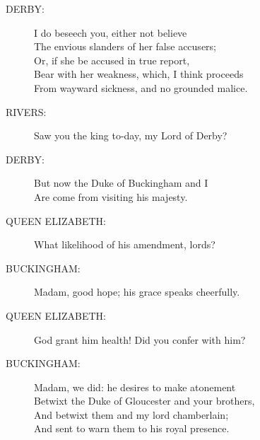 \documentclass{article}
\begin{document}
\begin{description}
\item[DERBY:] 
\hspace{1pt}I do beseech you, either not believe\\
\hspace{1pt}The envious slanders of her false accusers;\\
\hspace{1pt}Or, if she be accused in true report,\\
\hspace{1pt}Bear with her weakness, which, I think proceeds\\
\hspace{1pt}From wayward sickness, and no grounded malice.\\
\end{description}
\begin{description}
\item[RIVERS:] 
\hspace{1pt}Saw you the king to-day, my Lord of Derby?\\
\end{description}
\begin{description}
\item[DERBY:] 
\hspace{1pt}But now the Duke of Buckingham and I\\
\hspace{1pt}Are come from visiting his majesty.\\
\end{description}
\begin{description}
\item[QUEEN ELIZABETH:] 
\hspace{1pt}What likelihood of his amendment, lords?\\
\end{description}
\begin{description}
\item[BUCKINGHAM:] 
\hspace{1pt}Madam, good hope; his grace speaks cheerfully.\\
\end{description}
\begin{description}
\item[QUEEN ELIZABETH:] 
\hspace{1pt}God grant him health! Did you confer with him?\\
\end{description}
\begin{description}
\item[BUCKINGHAM:] 
\hspace{1pt}Madam, we did: he desires to make atonement\\
\hspace{1pt}Betwixt the Duke of Gloucester and your brothers,\\
\hspace{1pt}And betwixt them and my lord chamberlain;\\
\hspace{1pt}And sent to warn them to his royal presence.\\
\end{description}
\end{document}
